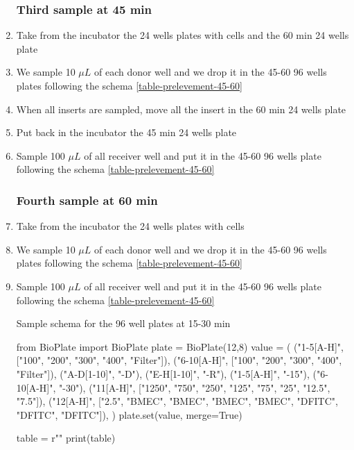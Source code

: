 \begin{enumerate}
\subsubsection{Third sample at \textbf{45 min}}
\item Take from the incubator the 24 wells plates with cells and the 60 min 24 wells plate
\item We sample 10 $\mu L$ of each donor well and we drop it in the 45-60 96 wells plates following the schema \ref{table-prelevement-45-60}
\item When all inserts are sampled, move all the insert in the 60 min 24 wells plate
\item Put back in the incubator the 45 min 24 wells plate
\item Sample 100 $\mu L$ of all receiver well and put it in the 45-60 96 wells plate following the schema \ref{table-prelevement-45-60}
\subsubsection{Fourth sample at \textbf{60 min}}
\item Take from the incubator the 24 wells plates with cells
\item We sample 10 $\mu L$ of each donor well and we drop it in the 45-60 96 wells plates following the schema \ref{table-prelevement-45-60}
\item Sample 100 $\mu L$ of all receiver well and put it in the 45-60 96 wells plate following the schema \ref{table-prelevement-45-60}

\begin{table}[h]
\caption{Sample schema for the 96 well plates at 15-30 min}
\begin{pycode}

from BioPlate import BioPlate
plate = BioPlate(12,8)
value = (
    ("1-5[A-H]", ["100", "200", "300", "400", "Filter"]),
    ("6-10[A-H]", ["100", "200", "300", "400", "Filter"]),
    ("A-D[1-10]", "-D"),
    ("E-H[1-10]", "-R"),
    ("1-5[A-H]", "-15"),
    ("6-10[A-H]", "-30"),
    ("11[A-H]", ["1250", "750", "250", "125", "75", "25", "12.5", "7.5"]),
    ("12[A-H]", ["2.5", "BMEC", "BMEC", "BMEC", "BMEC", "DFITC", "DFITC", "DFITC"]),
)
plate.set(value, merge=True)

table = r""
print(table)
\end{pycode}
\label{table-prelevement-15-30}
\end{table}


\end{enumerate}
